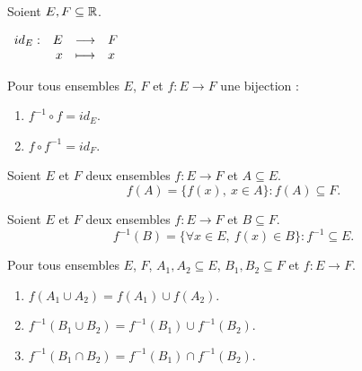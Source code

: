 \begin{definition}
    Soient $E, F \subseteq \mathbb{R}$.
	\begin{center}
		$
		\begin{array}{rrcl} id_E : & E & \longrightarrow & F \\ & x & \longmapsto & x \end{array}
		$
	\end{center}
\end{definition}

\begin{proposition}
	Pour tous ensembles $E$, $F$ et $f : E \to F$ une bijection :
    \begin{multicols}{2}
        \begin{enumerate}
            \item $f^{-1} \circ f = id_E$.
            \item $f \circ f^{-1} = id_F$.
        \end{enumerate}
    \end{multicols}
\end{proposition}

\begin{definition}
    Soient $E$ et $F$ deux ensembles $f : E \to F$ et $A \subseteq E$.
	\[ f(A) = \{ f(x),\ x \in A \} : f(A) \subseteq F. \]
\end{definition}

\begin{definition}
	Soient $E$ et $F$ deux ensembles $f : E \to F$ et $B \subseteq F$.
	\[ f^{-1}(B) = \{ \forall x \in E,\ f(x) \in B \} : f^{-1} \subseteq E. \]
\end{definition}

\begin{proposition}
    Pour tous ensembles $E$, $F$, $A_1, A_2 \subseteq E$, $B_1, B_2 \subseteq F$ et $f : E \to F$.
    \begin{enumerate}
        \item $f(A_1 \cup A_2) = f(A_1) \cup f(A_2)$.
        \item $f^{-1} (B_1 \cup B_2) = f^{-1} (B_1) \cup f^{-1} (B_2)$.
        \item $f^{-1} (B_1 \cap B_2) = f^{-1} (B_1) \cap f^{-1} (B_2)$.
    \end{enumerate}
\end{proposition} 

